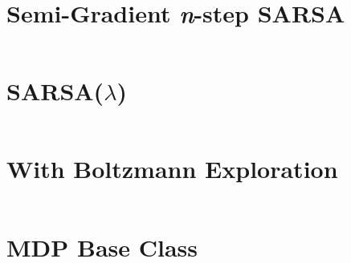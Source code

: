 \documentclass[12pt,letterpaper]{exam}
\begin{document}
\pagestyle{plain}
\thispagestyle{empty}

\section{Semi-Gradient \emph{n}-step SARSA}
\inputminted{python3}{../src/SemiGradSARSA.py}
\clearpage

\section{SARSA(\(\lambda\))}
\inputminted{python3}{../src/LambdaSARSA.py}
\clearpage

\section{With Boltzmann Exploration}
\inputminted{python3}{../src/boltzmann.py}
\clearpage

\section{MDP Base Class}
\inputminted{python3}{../src/MDP.py}
\end{document}

